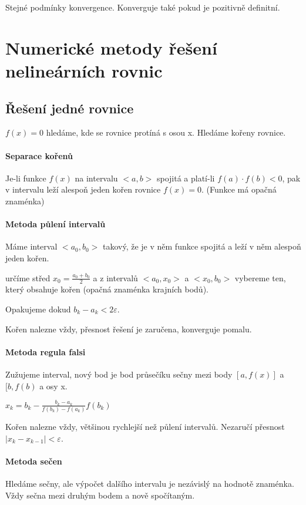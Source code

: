 \documentclass[a4paper, 11pt]{report}
\begin{document}
Stejné podmínky konvergence. Konverguje také pokud je pozitivně definitní.

\section{Numerické metody řešení nelineárních rovnic}

\subsection{Řešení jedné rovnice}
$f(x) = 0$ hledáme, kde se rovnice protíná s osou x. Hledáme kořeny rovnice.

\paragraph{Separace kořenů}

Je-li funkce $f(x)$ na intervalu $<a,b>$ spojitá a platí-li $ f(a) \cdot f(b) < 0$, pak v intervalu leží alespoň jeden kořen rovnice $f(x) = 0$. (Funkce má opačná znaménka)

\paragraph{Metoda půlení intervalů}
Máme interval $<a_0,b_0>$ takový, že je v něm funkce spojitá a leží v něm alespoň jeden kořen.

určíme střed $x_0 = \frac{a_0 + b_0}{2}$ a z intervalů $<a_0, x_0>$ a $<x_0, b_0>$ vybereme ten, který obsahuje kořen (opačná znaménka krajních bodů).

Opakujeme dokud $b_k - a_k < 2 \varepsilon$.

Kořen nalezne vždy, přesnost řešení je zaručena, konverguje pomalu.

\paragraph{Metoda regula falsi}
Zužujeme interval, nový bod je bod průsečíku sečny mezi body $[a, f(x)]$ a $[b, f(b)$ a osy x.

$x_k = b_k - \frac{b_k - a_k}{f(b_k) - f(a_k)} f(b_k)$

Kořen nalezne vždy, většinou rychlejší než půlení intervalů. Nezaručí přesnost $|x_k - x_{k-1}| < \varepsilon$.

\paragraph{Metoda sečen}
Hledáme sečny, ale výpočet dalšího intervalu je nezávislý na hodnotě znaménka. Vždy sečna mezi druhým bodem a nově spočítaným.
\end{document}
